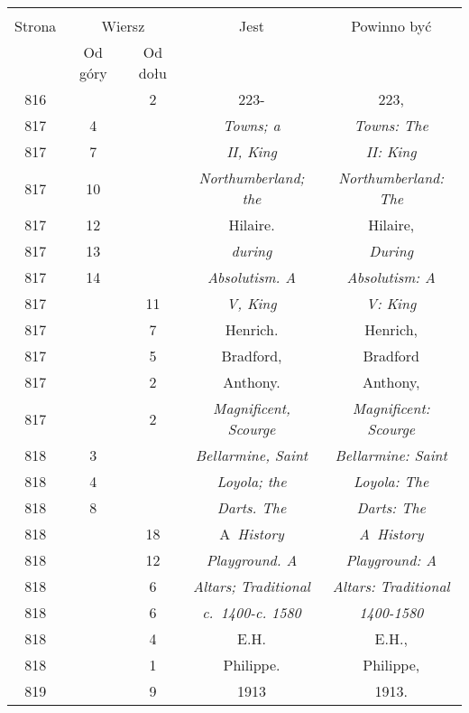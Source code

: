 \documentclass[a4paper,11pt]{article}
\begin{document}
\begin{center}
  \begin{tabular}{|c|c|c|c|c|}
    \hline
    & \multicolumn{2}{c|}{} & & \\
    Strona & \multicolumn{2}{c|}{Wiersz} & Jest
                              & Powinno być \\ \cline{2-3}
    & Od góry & Od dołu & & \\
    \hline
    816 & &  2 & 223- & 223, \\
    817 &  4 & & \textit{Towns; a} & \textit{Towns: The} \\
    817 &  7 & & \textit{II, King} & \textit{II: King} \\
    817 & 10 & & \textit{Northumberland; the}
           & \textit{Northumberland: The} \\
    817 & 12 & & Hilaire. & Hilaire, \\
    817 & 13 & & \textit{during} & \textit{During} \\
    817 & 14 & & \textit{Absolutism. A} & \textit{Absolutism: A} \\
    817 & & 11 & \textit{V, King} & \textit{V: King} \\
    817 & &  7 & Henrich. & Henrich, \\
    817 & &  5 & Bradford, & Bradford \\
    817 & &  2 & Anthony. & Anthony, \\
    817 & &  2 & \textit{Magnificent, Scourge}
           & \textit{Magnificent: Scourge} \\
    818 &  3 & & \textit{Bellarmine, Saint} & \textit{Bellarmine: Saint} \\
    818 &  4 & & \textit{Loyola; the} & \textit{Loyola: The} \\
    818 &  8 & & \textit{Darts. The} & \textit{Darts: The} \\
    818 & & 18 & A~\textit{History} & \textit{A~History} \\
    818 & & 12 & \textit{Playground. A} & \textit{Playground: A} \\
    818 & &  6 & \textit{Altars; Traditional}
           & \textit{Altars: Traditional} \\
    818 & &  6 & \textit{c.~1400-c. 1580} & \textit{1400-1580} \\
    818 & &  4 & E.H. & E.H., \\
    818 & &  1 & Philippe. & Philippe, \\
    819 & &  9 & 1913 & 1913. \\

\end{tabular}
\end{center}
\end{document}

